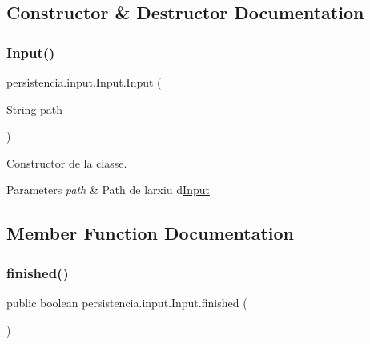 \subsection{Constructor \& Destructor Documentation}
\mbox{\label{classpersistencia_1_1input_1_1Input_a9b30ef8d489a1fc5b4aa04a14474349a}} 
\subsubsection{\texorpdfstring{Input()}{Input()}}
{\footnotesize\ttfamily persistencia.\+input.\+Input.\+Input (\begin{DoxyParamCaption}\item[{String}]{path }\end{DoxyParamCaption})\hspace{0.3cm}{\ttfamily [inline]}}



Constructor de la classe. 


\begin{DoxyParams}{Parameters}
{\em path} & Path de l\textquotesingle{}arxiu d\textquotesingle{}\hyperlink{classpersistencia_1_1input_1_1Input}{Input} \\
\hline
\end{DoxyParams}


\subsection{Member Function Documentation}
\mbox{\label{classpersistencia_1_1input_1_1Input_af607cad1726ef15cf8e970dcbee74b68}} 
\subsubsection{\texorpdfstring{finished()}{finished()}}
{\footnotesize\ttfamily public boolean persistencia.\+input.\+Input.\+finished (\begin{DoxyParamCaption}{ }\end{DoxyParamCaption})\hspace{0.3cm}{\ttfamily [inline]}}

